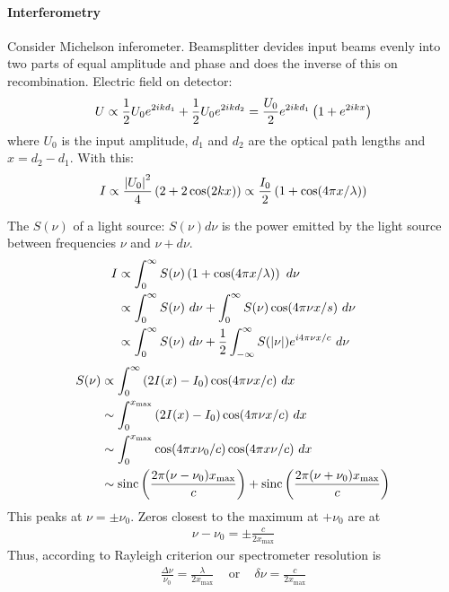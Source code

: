\paragraph{Interferometry}
Consider Michelson inferometer. Beamsplitter devides input beams evenly into two
parts of equal amplitude and phase and does the inverse of this on recombination.
Electric field on detector:
\begin{align*}
    U \propto \frac{1}{2} U_0 e^{2 i k d_1} + \frac{1}{2} U_0 e^{2 i k d_2}
    = \frac{U_0}{2} e^{2 i k d_1} \left( 1+e^{2 i k x} \right)
\end{align*}
where $U_0$ is the input amplitude, $d_1$ and $d_2$ are the optical path lengths
and $x = d_2 - d_1$. With this:
\begin{align*}
    I \propto \frac{\left\vert U_0 \right\vert^2}{4} \left( 2 + 2 \cos(2 k x) \right)
    \propto \frac{I_0}{2} \left( 1+\cos(4 \pi x / \lambda) \right)
\end{align*}

The  $S(\nu)$ of a light source:
$S(\nu) d \nu$ is the power emitted by the light source between frequencies
$\nu$ and $\nu + d \nu$.
\begin{align*}
    I &\propto \int_0^\infty S(\nu) \left( 1+\cos(4 \pi x / \lambda) \right) \ d \nu
    \\
    &\propto \int_0^\infty S(\nu) \ d \nu + \int_0^\infty S(\nu) \cos(4 \pi \nu x / s) \ d \nu
    \\
    &\propto \int_0^\infty S(\nu) \ d \nu + \frac{1}{2} \int_{-\infty}^\infty S(\left\vert \nu \right\vert) e^{i 4 \pi \nu x / c} \ d \nu
\end{align*}
\begin{align*}
    S(\nu) &\propto \int_0^\infty \left( 2 I(x) - I_0 \right) \cos(4 \pi \nu x / c) \ d x
    \\
    &\sim \int_0^{x_{\text{max}}} \left( 2 I(x) - I_0 \right) \cos(4 \pi \nu x / c) \ d x
    \\
    &\sim \int_0^{x_{\text{max}}} \cos (4 \pi x \nu_0 / c) \cos(4 \pi x \nu / c) \ dx
    \\
    &\sim \text{sinc} \left( \frac{2 \pi (\nu - \nu_0) x_{\text{max}}}{c} \right)
        + \text{sinc} \left( \frac{2 \pi (\nu + \nu_0) x_{\text{max}}}{c} \right)
\end{align*}
This peaks at $\nu = \pm \nu_0$. Zeros closest to the maximum at $+\nu_0$ are at
\begin{align*}
    \nu - \nu_0 = \pm \frac{c}{2 x_{\text{max}}}
\end{align*}
Thus, according to Rayleigh criterion our spectrometer resolution is
\begin{align*}
    \frac{\Delta \nu}{\nu_0} = \frac{\lambda}{2 x_{\text{max}}}
    \hspace{10pt} \text{ or } \hspace{10pt}
    \delta \nu = \frac{c}{2 x_{\text{max}}}
\end{align*}


